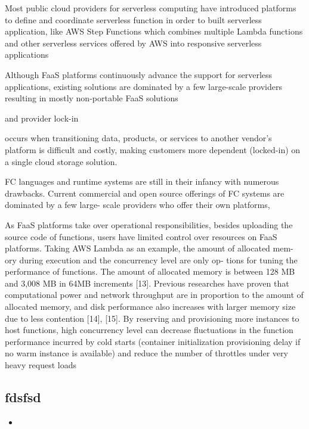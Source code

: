 Most public cloud providers for serverless computing have introduced platforms to define and coordinate serverless function in order to built serverless application, like AWS Step Functions which combines multiple Lambda functions and other serverless services offered by AWS into responsive serverless applications

Although FaaS platforms continuously advance the support for serverless applications, existing solutions are dominated by a few large-scale providers resulting in mostly non-portable FaaS solutions 

and provider lock-in

occurs when transitioning data, products, or services to another vendor's platform is difficult and costly, making customers more dependent (locked-in) on a single cloud storage solution.

FC languages and runtime systems are still in their
infancy with numerous drawbacks. Current commercial and open
source offerings of FC systems are dominated by a few large-
scale providers who offer their own platforms, 

As FaaS platforms take over operational responsibilities,
besides uploading the source code of functions, users have
limited control over resources on FaaS platforms. Taking
AWS Lambda as an example, the amount of allocated mem-
ory during execution and the concurrency level are only op-
tions for tuning the performance of functions. The amount
of allocated memory is between 128 MB and 3,008 MB
in 64MB increments [13]. Previous researches have proven
that computational power and network throughput are in
proportion to the amount of allocated memory, and disk
performance also increases with larger memory size due
to less contention [14], [15]. By reserving and provisioning
more instances to host functions, high concurrency level can
decrease ﬂuctuations in the function performance incurred
by cold starts (container initialization provisioning delay if
no warm instance is available) and reduce the number of
throttles under very heavy request loads



\subsection{fdsfsd}




\begin{itemize}
	\item 
\end{itemize}

